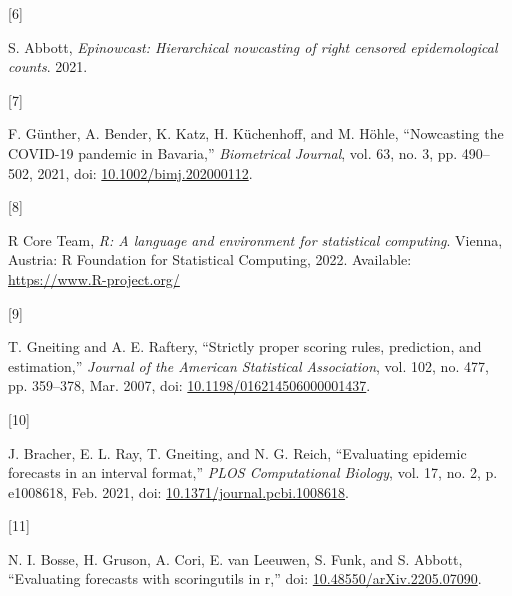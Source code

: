 \documentclass[
  a4paper,
]{article}
\newlength{\cslhangindent}
\newlength{\csllabelwidth}
\newlength{\cslentryspacingunit} %
\newenvironment{CSLReferences}[2] %
 {%
  \setlength{\parindent}{0pt}
  \ifodd #1
  \let\oldpar\par
  \def\par{\hangindent=\cslhangindent\oldpar}
  \fi
  \setlength{\parskip}{#2\cslentryspacingunit}
 }%
 {}
\newcommand{\CSLLeftMargin}[1]{\parbox[t]{\csllabelwidth}{#1}}
\newcommand{\CSLRightInline}[1]{\parbox[t]{\linewidth - \csllabelwidth}{#1}\break}
\begin{document}
\begin{CSLReferences}{0}{0}
\leavevmode{}%
\CSLLeftMargin{{[}6{]} }%
\CSLRightInline{S. Abbott, \emph{Epinowcast: Hierarchical nowcasting of
right censored epidemological counts}. 2021.}

\leavevmode{}%
\CSLLeftMargin{{[}7{]} }%
\CSLRightInline{F. Günther, A. Bender, K. Katz, H. Küchenhoff, and M.
Höhle, {``Nowcasting the COVID-19 pandemic in Bavaria,''}
\emph{Biometrical Journal}, vol. 63, no. 3, pp. 490--502, 2021, doi:
\href{https://doi.org/10.1002/bimj.202000112}{10.1002/bimj.202000112}.}

\leavevmode{}%
\CSLLeftMargin{{[}8{]} }%
\CSLRightInline{R Core Team, \emph{R: A language and environment for
statistical computing}. Vienna, Austria: R Foundation for Statistical
Computing, 2022. Available: \url{https://www.R-project.org/}}

\leavevmode{}%
\CSLLeftMargin{{[}9{]} }%
\CSLRightInline{T. Gneiting and A. E. Raftery, {``Strictly proper
scoring rules, prediction, and estimation,''} \emph{Journal of the
American Statistical Association}, vol. 102, no. 477, pp. 359--378, Mar.
2007, doi:
\href{https://doi.org/10.1198/016214506000001437}{10.1198/016214506000001437}.}

\leavevmode{}%
\CSLLeftMargin{{[}10{]} }%
\CSLRightInline{J. Bracher, E. L. Ray, T. Gneiting, and N. G. Reich,
{``Evaluating epidemic forecasts in an interval format,''} \emph{PLOS
Computational Biology}, vol. 17, no. 2, p. e1008618, Feb. 2021, doi:
\href{https://doi.org/10.1371/journal.pcbi.1008618}{10.1371/journal.pcbi.1008618}.}

\leavevmode{}%
\CSLLeftMargin{{[}11{]} }%
\CSLRightInline{N. I. Bosse, H. Gruson, A. Cori, E. van Leeuwen, S.
Funk, and S. Abbott, {``Evaluating forecasts with scoringutils in r,''}
doi:
\href{https://doi.org/10.48550/arXiv.2205.07090}{10.48550/arXiv.2205.07090}.}

\end{CSLReferences}
\end{document}

